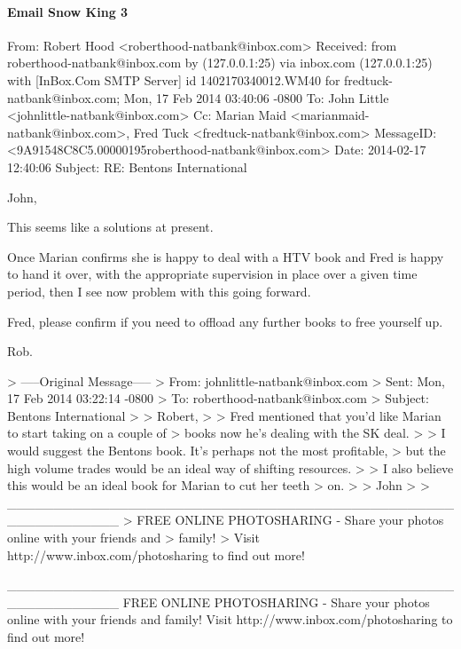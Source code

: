 \paragraph{Email Snow King 3}
\label{SnowKing3}
\begin{spverbatim}
From: Robert Hood <roberthood-natbank@inbox.com>
Received: from roberthood-natbank@inbox.com by (127.0.0.1:25) via inbox.com
  (127.0.0.1:25) with [InBox.Com SMTP Server] id 1402170340012.WM40 for
  fredtuck-natbank@inbox.com; Mon, 17 Feb 2014 03:40:06 -0800
To: John Little <johnlittle-natbank@inbox.com>
Cc: Marian Maid <marianmaid-natbank@inbox.com>, Fred Tuck
  <fredtuck-natbank@inbox.com>
MessageID: <9A91548C8C5.00000195roberthood-natbank@inbox.com>
Date: 2014-02-17 12:40:06
Subject: RE: Bentons International

John,

This seems like a solutions at present. 

Once Marian confirms she is happy to deal with a HTV book and Fred is happy to hand it over, with the appropriate supervision in place over a given time period, then I see now problem with this going forward.

Fred, please confirm if you need to offload any further books to free yourself up.

Rob.

> -----Original Message-----
> From: johnlittle-natbank@inbox.com
> Sent: Mon, 17 Feb 2014 03:22:14 -0800
> To: roberthood-natbank@inbox.com
> Subject: Bentons International
> 
> Robert,
> 
> Fred mentioned that you'd like Marian to start taking on a couple of
> books now he's dealing with the SK deal.
> 
> I would suggest the Bentons book. It's perhaps not the most profitable,
> but the high volume trades would be an ideal way of shifting resources.
> 
> I also believe this would be an ideal book for Marian to cut her teeth
> on.
> 
> John
> 
> ____________________________________________________________
> FREE ONLINE PHOTOSHARING - Share your photos online with your friends and
> family!
> Visit http://www.inbox.com/photosharing to find out more!

____________________________________________________________
FREE ONLINE PHOTOSHARING - Share your photos online with your friends and family!
Visit http://www.inbox.com/photosharing to find out more!


\end{spverbatim}


